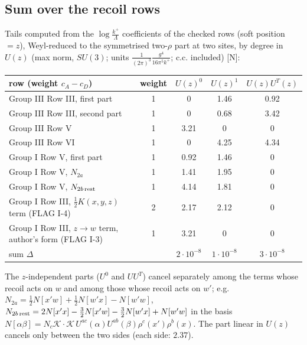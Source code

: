 \documentclass[9pt]{article}
\numberwithin{equation}{section}
\begin{document}
\subsection{Sum over the recoil rows}
\noindent Tails computed from the $\log\frac{k^{+}}{\Lambda}$ coefficients of the checked rows (soft position $=z$), Weyl-reduced to the symmetrised two-$\rho$ part at two sites, by degree in $U(z)$ (max norm, $SU(3)$; units $\frac{1}{(2\pi)^{3}}\frac{g^{4}}{16\pi^{5}k^{+}}$; c.c. included) [N]:
\begin{center}
\begin{tabular}{l|c|ccc}
row (weight $c_{A}-c_{D}$) & weight & $U(z)^{0}$ & $U(z)^{1}$ & $U(z)U^{T}(z)$\\\hline
Group III Row III, first part & 1 & 0 & 1.46 & 0.92\\
Group III Row III, second part & 1 & 0 & 0.68 & 3.42\\
Group III Row V & 1 & 3.21 & 0 & 0\\
Group III Row VI & 1 & 0 & 4.25 & 4.34\\
Group I Row V, first part & 1 & 0.92 & 1.46 & 0\\
Group I Row V, $N_{2a}$ & 1 & 1.41 & 1.95 & 0\\
Group I Row V, $N_{2b\,\rm rest}$ & 1 & 4.14 & 1.81 & 0\\
Group I Row III, $\frac12K(x,y,z)$ term (FLAG I-4) & 2 & 2.17 & 2.12 & 0\\
Group I Row III, $z\to w$ term, author's form (FLAG I-3) & 1 & 3.21 & 0 & 0\\\hline
sum $\Delta$ & & $2\cdot10^{-8}$ & $1\cdot10^{-8}$ & $3\cdot10^{-8}$
\end{tabular}
\end{center}
The $z$-independent parts ($U^{0}$ and $UU^{T}$) cancel separately among the terms whose recoil acts on $w$ and among those whose recoil acts on $w'$; e.g. $N_{2a}=\frac12N[x'w]+\frac12N[w'x]-N[w'w]$, $N_{2b\,\rm rest}=2N[x'x]-\frac32N[x'w]-\frac32N[w'x]+N[w'w]$ in the basis $N[\alpha\beta]=N_{c}\mathcal{K}\cdot\mathcal{K}\,U^{ac}(\alpha)U^{ab}(\beta)\rho^{c}(x')\rho^{b}(x)$. The part linear in $U(z)$ cancels only between the two sides (each side: $2.37$).
\end{document}
